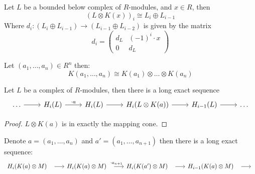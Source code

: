 \begin{lemma}
	\label{lem:koszul_tensor_as_mapping_cone}
	Let $L$ be a bounded below complex of $R$-modules, and $x \in R$, then
	$$(L \otimes K(x))_i \cong L_i \oplus L_{i-1}$$
	Where $d_i: (L_i \oplus L_{i-1}) \to (L_{i-1}\oplus L_{i-2})$ is given by the matrix
	$$d_i = \begin{pmatrix}d_L & (-1)^i \cdot x \\ 0 & d_L\end{pmatrix}$$
\end{lemma}

\begin{theorem}
	\label{thm:long_koszul_build_by_tensoring}
	Let $(a_1, \dots, a_n) \in R^n$ then:
	$$K(a_1, \dots, a_n) \cong K(a_1) \otimes \dots \otimes K(a_n)$$
\end{theorem}

\begin{lemma}
	\label{lem:koszul_induces_long_exact_seq}
	Let $L$ be a complex of $R$-modules, then there is a long exact sequence
\[\begin{tikzcd}
	\dots & {H_i(L)} & {H_i(L)} & {H_i(L\otimes K(a))} & {H_{i-1}(L)} & \dots
	\arrow[from=1-1, to=1-2]
	\arrow["{\cdot a}", from=1-2, to=1-3]
	\arrow[from=1-3, to=1-4]
	\arrow[from=1-4, to=1-5]
	\arrow[from=1-5, to=1-6]
\end{tikzcd}\]

\begin{proof}
	$L \otimes K(a)$ is in exactly the mapping cone.
\end{proof}

\end{lemma}


\begin{corollary}
	\label{cor:tensor_koszul_induced_long_exact_seq}
	Denote $a = (a_1, \dots, a_n)$ and $a' = (a_1, \dots, a_{n+1})$ then there is a long exact sequence:
\[\begin{tikzcd}
	{H_i(K(a) \otimes M)} & {H_i(K(a) \otimes M)} & {H_i(K(a') \otimes M)} & {H_{i-1}(K(a) \otimes M)} & 
	\arrow[shorten <=8pt, from=1-1, to=1-2]
	\arrow[shorten <=8pt, "{\cdot a_{n+1}}", from=1-2, to=1-3]
	\arrow[shorten <=8pt, from=1-3, to=1-4]
	\arrow[shorten <=8pt, from=1-4, to=1-5]
\end{tikzcd}\]
\end{corollary}

